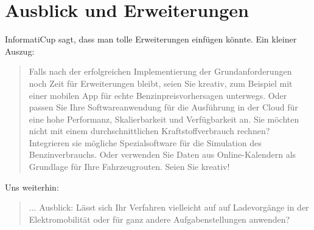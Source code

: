 \documentclass[11pt]{article}
\begin{document}
\section{Ausblick und Erweiterungen}
	InformatiCup sagt, dass man tolle Erweiterungen einfügen könnte. Ein kleiner Auszug: 
	\begin{quote}
		Falls nach der erfolgreichen Implementierung der Grundanforderungen noch Zeit für Erweiterungen bleibt, seien Sie kreativ, zum Beispiel mit einer mobilen App für echte Benzinpreisvorhersagen unterwegs. Oder passen Sie Ihre Softwareanwendung für die Ausführung in der Cloud für eine hohe Performanz, Skalierbarkeit und Verfügbarkeit an. Sie möchten nicht mit einem durchschnittlichen Kraftstoffverbrauch rechnen? Integrieren sie mögliche Spezialsoftware für die Simulation des Benzinverbrauchs. Oder verwenden Sie Daten aus Online-Kalendern als Grundlage für Ihre Fahrzeugrouten. Seien Sie kreativ!
	\end{quote}
	Uns weiterhin:
	\begin{quote}
		... Ausblick: Lässt sich Ihr Verfahren vielleicht auf auf Ladevorgänge in der Elektromobilität oder für ganz andere Aufgabenstellungen anwenden?
	\end{quote}
	
\end{document}
